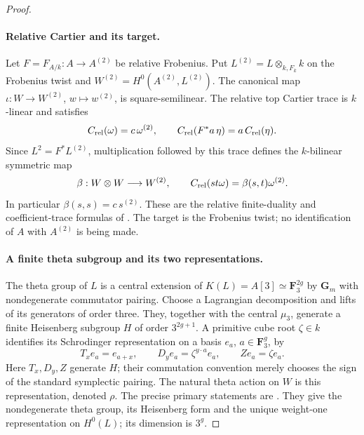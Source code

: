 \begin{proof}
\paragraph{Relative Cartier and its target.}
Let $F=F_{A/k}:A\to A^{(2)}$ be relative Frobenius. Put
$L^{(2)}=L\otimes_{k,F_k}k$ on the Frobenius twist and
$W^{(2)}=H^0(A^{(2)},L^{(2)})$. The canonical map
$\iota:W\to W^{(2)}$, $w\mapsto w^{(2)}$, is square-semilinear.
The relative top Cartier trace is $k$-linear and satisfies
\[
 C_{\rm rel}(\omega)=c\,\omega^{(2)},\qquad
 C_{\rm rel}(F^*a\,\eta)=a\,C_{\rm rel}(\eta).
\]
Since $L^2=F^*L^{(2)}$, multiplication followed by this trace defines
the $k$-bilinear symmetric map
\begin{equation}\label{eq:ppav-relative-beta}
 \beta:W\otimes W\longrightarrow W^{(2)},\qquad
 C_{\rm rel}(s t\omega)=\beta(s,t)\omega^{(2)}.
\end{equation}
In particular $\beta(s,s)=c\,s^{(2)}$.
These are the relative finite-duality and coefficient-trace formulas
of \cite[Lemma~1.3.6, Proposition~1.3.7, Theorem~1.3.8, pp.~26--28]
{BrionKumar2005}. The target is the Frobenius twist; no identification
of $A$ with $A^{(2)}$ is being made.

\paragraph{A finite theta subgroup and its two representations.}
The theta group of $L$ is a central extension of
$K(L)=A[3]\simeq\mathbf F_3^{2g}$ by $\mathbf G_m$ with nondegenerate
commutator pairing. Choose a Lagrangian decomposition and lifts of
its generators of order three. They, together with the central
$\mu_3$, generate a finite Heisenberg subgroup $H$ of order
$3^{2g+1}$. A primitive cube root $\zeta\in k$ identifies its
Schrodinger representation on a basis $e_a$, $a\in\mathbf F_3^g$, by
\[
 T_x e_a=e_{a+x},\qquad D_y e_a=\zeta^{y\cdot a}e_a,
 \qquad Z e_a=\zeta e_a.
\]
Here $T_x,D_y,Z$ generate $H$; their commutation convention merely
chooses the sign of the standard symplectic pairing.
The natural theta action on $W$ is this representation, denoted
$\rho$. The precise primary statements are
\cite[Corollary~8.20, Lemma~8.24, Theorem~8.28, description~8.29,
pp.~119, 121--123; Corollary~9.17, pp.~133--134]
{EdixhovenVanDerGeerMoonenAV}. They give the nondegenerate theta
group, its Heisenberg form and the unique weight-one representation
on $H^0(L)$; its dimension is $3^g$.


\end{proof}
